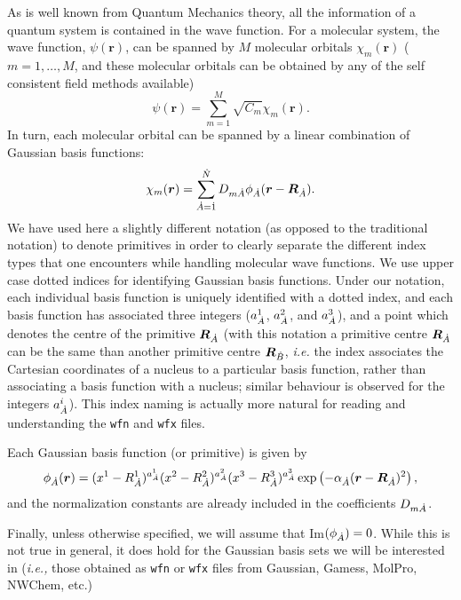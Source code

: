 As is well known from Quantum Mechanics theory, all the information of a quantum system is
contained in the wave function. For a molecular system,  the wave function, $\psi(\boldsymbol{r})$,
can be spanned by $M$ molecular orbitals $\chi_m(\boldsymbol{r})$ ($m=1,\dots,M$, and these
molecular orbitals can be obtained by any of the self consistent field methods available)
%
\begin{equation}
   \psi(\boldsymbol{r})=\sum_{m=1}^{M}\sqrt{C_m}\chi_m(\boldsymbol{r}).
\end{equation}
%
In turn, each molecular orbital can be spanned by a linear combination of Gaussian basis functions:
\begin{equation}
   \chi_m(\boldsymbol{r})=\sum_{\dot{A}=\dot{1}}^{\dot{N}}D_{m\dot{A}}\phi_{\dot{A}}(\boldsymbol{r}-\boldsymbol{R}_{\dot{A}}).
\end{equation}
%
We have used here a slightly different notation (as opposed to the traditional notation) to denote
primitives in order to clearly separate the different index types that one encounters while handling
molecular wave functions. We use upper case dotted indices for identifying Gaussian basis functions.
Under our notation, each individual basis function is uniquely identified with a dotted index, and
each basis function has associated three integers ($a^1_{\dot{A}}$, $a^2_{\dot{A}}$, and $a^3_{\dot{A}}$), and a
point which denotes the centre of the primitive $\boldsymbol{R}_{\dot{A}}$ (with this notation a
primitive centre $\boldsymbol{R}_{\dot{A}}$ can be the same than another primitive centre
$\boldsymbol{R}_{\dot{B}}$, \textit{i.e.} the index associates the Cartesian coordinates of a nucleus
to a particular basis function, rather than associating a basis function with a nucleus;
similar behaviour is observed for the integers $a^i_{\dot{A}}$). This index naming is actually more
natural for reading and understanding the \texttt{wfn} and \texttt{wfx} files. 

Each Gaussian basis function (or primitive) is given by
%
\begin{equation}\label{eq:primitivedef}
   \phi_{\dot{A}}(\boldsymbol{r})=(x^1-R^1_{\dot{A}})^{a^1_{\dot{A}}}(x^2-R^2_{\dot{A}})^{a^2_{\dot{A}}}(x^3-R^3_{\dot{A}})^{a^3_{\dot{A}}}
   \exp\left(-\alpha_{\dot{A}}(\boldsymbol{r}-\boldsymbol{R}_{\dot{A}})^2\right),
\end{equation}
%
and the normalization constants are already included in the coefficients $D_{m\dot{A}}$.

Finally, unless otherwise specified, we will assume that Im$(\phi_{\dot{A}})=0$. While this is not true in general, it does hold for the Gaussian basis sets we will be interested in (\textit{i.e.,} those obtained as \texttt{wfn} or \texttt{wfx} files from Gaussian, Gamess, MolPro, NWChem, etc.)


